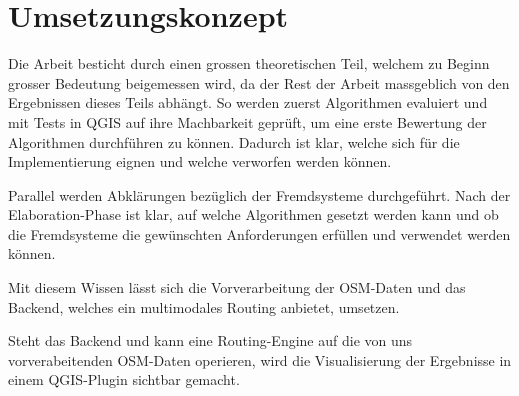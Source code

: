 \section{Umsetzungskonzept}
\label{sec:Umsetzungskonzept}

Die Arbeit besticht durch einen grossen theoretischen Teil, welchem zu Beginn grosser Bedeutung beigemessen wird, da der Rest der Arbeit massgeblich von den Ergebnissen dieses Teils abhängt. So werden zuerst Algorithmen evaluiert und mit Tests in \gls{QGIS} auf ihre Machbarkeit geprüft, um eine erste Bewertung der Algorithmen durchführen zu können. Dadurch ist klar, welche sich für die Implementierung eignen und welche verworfen werden können.

Parallel werden Abklärungen bezüglich der Fremdsysteme durchgeführt. Nach der Elaboration-Phase ist klar, auf welche Algorithmen gesetzt werden kann und ob die Fremdsysteme die gewünschten Anforderungen erfüllen und verwendet werden können.

Mit diesem Wissen lässt sich die Vorverarbeitung der \ac{OSM}-Daten und das Backend, welches ein multimodales Routing anbietet, umsetzen.

Steht das Backend und kann eine \gls{Routing-Engine} auf die von uns vorverabeitenden \ac{OSM}-Daten operieren, wird die Visualisierung der Ergebnisse in einem \gls{QGIS}-Plugin sichtbar gemacht.
